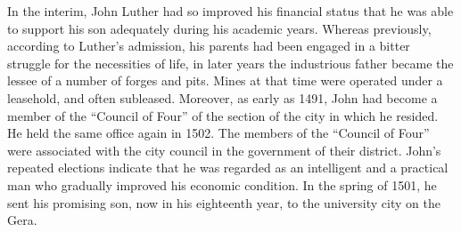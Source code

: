 In the interim, John Luther had so improved his financial status
that he was able to support his son adequately during his academic
years. Whereas previously, according to Luther’s admission, his parents had been engaged in a bitter struggle for the necessities of life,
in later years the industrious father became the lessee of a number
of forges and pits. Mines at that time were operated under a leasehold, and often subleased. Moreover, as early as 1491, John had become a member of the “Council of Four” of the section of the city
in which he resided. He held the same office again in 1502. The members of the “Council of Four” were associated with the city council
in the government of their district. John’s repeated elections indicate
that he was regarded as an intelligent and a practical man who gradually improved his economic condition. In the spring of 1501, he sent
his promising son, now in his eighteenth year, to the university city on
the Gera.
